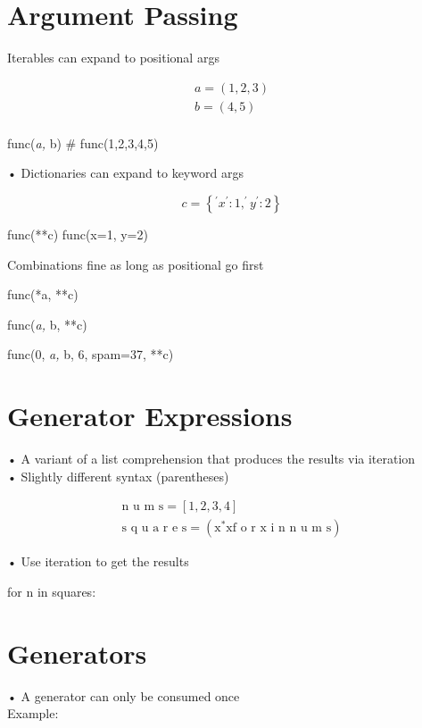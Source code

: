 \documentclass[
  letterpaper,
  DIV=11,
  numbers=noendperiod]{scrreprt}
\begin{document}

\chapter{Argument Passing}\label{argument-passing}

Iterables can expand to positional args

\[
\begin{array}{l} a = (1, 2, 3) \\ b = (4, 5) \\ \end{array}
\]

func(\emph{a, }b) \# func(1,2,3,4,5)

• Dictionaries can expand to keyword args

\[
c = \left\{^ {\prime} x ^ {\prime}: 1, ^ {\prime} y ^ {\prime}: 2 \right\}
\]

func(**c) func(x=1, y=2)

Combinations fine as long as positional go first

func(*a, **c)

func(\emph{a, }b, **c)

func(0, \emph{a, }b, 6, spam=37, **c)


\chapter{Generator Expressions}\label{generator-expressions}

• A variant of a list comprehension that produces the results via
iteration\\
• Slightly different syntax (parentheses)

\[
\begin{array}{l} \text {n u m s} = [ 1, 2, 3, 4 ] \\ \text {s q u a r e s} = (\mathrm {x} ^ {*} \mathrm {x} \text {f o r x i n n u m s}) \end{array}
\]

• Use iteration to get the results

for n in squares:


\chapter{Generators}\label{generators}

• A generator can only be consumed once\\
Example:
\end{document}
